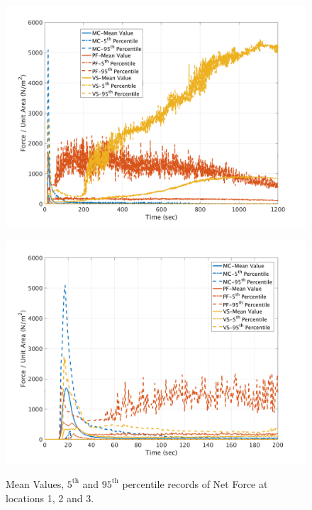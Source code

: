 \documentclass[a4paper,10pt]{article}
\begin{document}
\begin{figure}[H]
	\begin{minipage}[b]{0.5\linewidth}
	\centering
    \includegraphics[width=1\textwidth]{NetFAll/NetF3All.png}     
        \label{fig:NF3}
	\end{minipage}
	\begin{minipage}[b]{0.5\linewidth}
	\centering
    \includegraphics[width=1\textwidth]{NetFAll/NetF3All_z.png}
        \label{fig:NF3zoom}
	\end{minipage}
	
	\caption{Mean Values, $5^{\mathrm{th}}$ and $95^{\mathrm{th}}$ percentile records of Net Force at locations 1, 2 and 3.}\label{fig:NF123}	
\end{figure}
\end{document}
